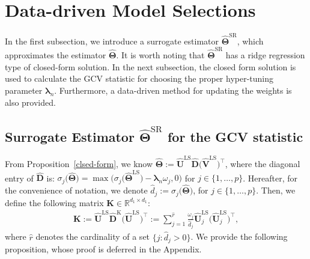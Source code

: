 \documentclass[alpha-refs]{wiley-article}
\begin{document}
\section{Data-driven Model Selections} \label{parameter_selection}
In the first subsection, we introduce a surrogate estimator $\widehat{\boldsymbol{\Theta}}^{\text{SR}}$, which approximates the estimator $\widehat{\boldsymbol{\Theta}}$.
It is worth noting that $\widehat{\boldsymbol{\Theta}}^{\text{SR}}$ has a ridge regression type of closed-form solution.
In the next subsection, the closed form solution is used to calculate the GCV statistic for choosing the proper hyper-tuning parameter  $\boldsymbol{\lambda}_{n}$.
Furthermore, a data-driven method for updating the weights is also provided.

\subsection{Surrogate Estimator $\widehat{\boldsymbol{\Theta}}^{\text{SR}}$ for the GCV statistic}
From Proposition~\ref{clsed-form}, we know $\widehat{\boldsymbol{\Theta}} := \widehat{\boldsymbol{U}}^{\text{LS}}\widehat{\boldsymbol{D}}\big(\widehat{\boldsymbol{V}}^{\text{LS}}\big)^{\top}$,
where the diagonal entry of $\widehat{\boldsymbol{D}}$ is: $\sigma_{j}\big(\widehat{\boldsymbol{\Theta}}\big) = \max \big(  \sigma_{j}\big(\widehat{\boldsymbol{\Theta}}^{\text{LS}}\big)-\boldsymbol{\lambda}_{n} \omega_{j},0 \big)$ for $j\in\{1,\dots,p\}$.
Hereafter, for the convenience of notation, we denote $\widehat{d}_{j}:=\sigma_{j}\big(\widehat{\boldsymbol{\Theta}}\big)$, for $j\in\{1,\dots,p\}$.
Then, we define the following matrix $\boldsymbol{K}\in\mathbb{R}^{d_{1}\times d_{1}}$:
\begin{align} \label{K}
    \boldsymbol{K}
    :=  \widehat{\boldsymbol{U}}^{\text{LS}} \widehat{\boldsymbol{D}}^{\text{K}} \big(\widehat{\boldsymbol{U}}^{\text{LS}} \big)^{\top}
    :=\sum_{j=1}^{\widehat{r}}
    \frac{\omega_{j}}{\widehat{d}_{j}}
    \widehat{\boldsymbol{U}}_{j}^{\text{LS}} \big(\widehat{\boldsymbol{U}}_{j}^{\text{LS}}\big)^{\top},
\end{align}
where $\widehat{r}$ denotes the cardinality of a set $\{j : \widehat{d}_{j}>0 \}$.
We provide the following proposition, whose proof is deferred in the Appendix.
\end{document}
